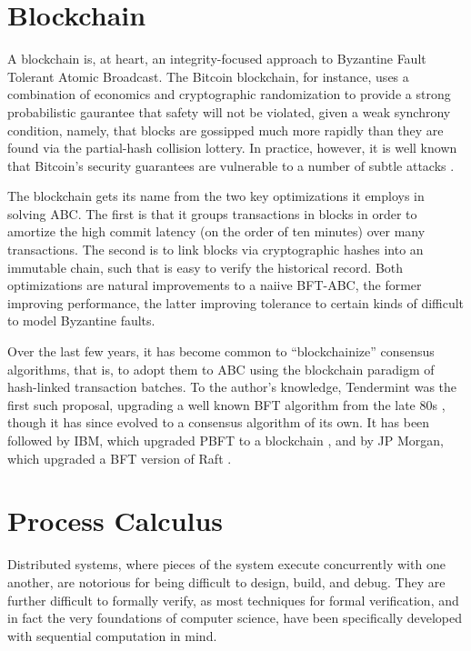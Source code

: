 \section{Blockchain}

A blockchain is, at heart, an integrity-focused approach to Byzantine Fault Tolerant Atomic Broadcast.
The Bitcoin blockchain, for instance, uses a combination of economics and cryptographic randomization 
to provide a strong probabilistic gaurantee that safety will not be violated, 
given a weak synchrony condition, namely, 
that blocks are gossipped much more rapidly than they are found via the partial-hash collision lottery.
In practice, however, it is well known that Bitcoin's security guarantees are vulnerable to a number 
of subtle attacks \cite{selfish_mining,block_witholding}.

The blockchain gets its name from the two key optimizations it employs in solving ABC.
The first is that it groups transactions in blocks in order to amortize the high commit latency 
(on the order of ten minutes) over many transactions.
The second is to link blocks via cryptographic hashes into an immutable chain,
such that is easy to verify the historical record.
Both optimizations are natural improvements to a naiive BFT-ABC,
the former improving performance, the latter improving tolerance to certain kinds 
of difficult to model Byzantine faults.

Over the last few years, it has become common to ``blockchainize'' consensus algorithms,
that is, to adopt them to ABC using the blockchain paradigm of hash-linked transaction batches.
To the author's knowledge, Tendermint was the first such proposal, 
upgrading a well known BFT algorithm from the late 80s \cite{dls},
though it has since evolved to a consensus algorithm of its own.
It has been followed by IBM, which upgraded PBFT to a blockchain \cite{obc_},
and by JP Morgan, which upgraded a BFT version of Raft \cite{juno}.

\section{Process Calculus}

Distributed systems, where pieces of the system execute concurrently with one another,
are notorious for being difficult to design, build, and debug.
They are further difficult to formally verify, 
as most techniques for formal verification, and in fact the very foundations of computer science,
have been specifically developed with sequential computation in mind.

